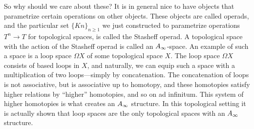 \begin{remark}
So why should we care about these? It is in general nice to have objects that parametrize certain operations on other objects. These objects are called operads, and the particular set $\{Kn\}_{n\geq 1}$ we just constructed to parametrize operations $T^n\longrightarrow T$ for topological spaces, is called the Stasheff operad. A topological space with the action of the Stasheff operad is called an $A_{\infty}$-space. An example of such a space is a loop space $\Omega X$ of some topological space $X$. The loop space $\Omega X$ consists of based loops in $X$, and naturally, we can equip such a space with a multiplication of two loops---simply by concatenation. The concatenation of loops is not associative, but is associative up to homotopy, and these homotopies satisfy higher relations by ``higher'' homotopies, and so on ad infinitum. This system of higher homotopies is what creates an $A_{\infty}$ structure. In this topological setting it is actually shown that loop spaces are the only topological spaces with an $A_{\infty}$ structure. 
\end{remark}
